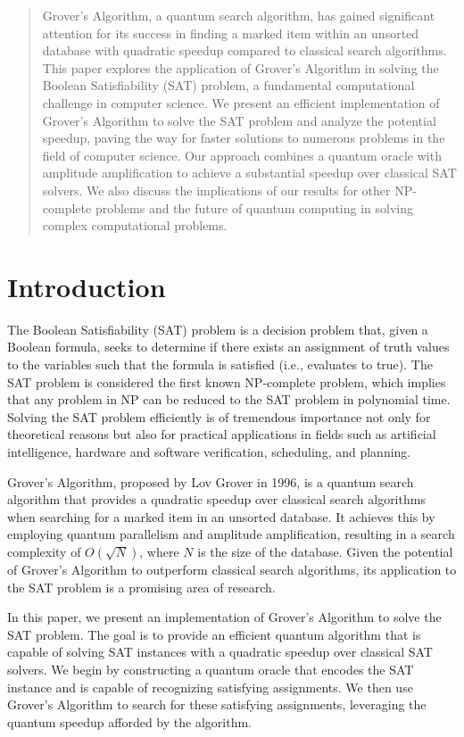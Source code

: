 \begin{abstract}
Grover's Algorithm, a quantum search algorithm, has gained significant attention for its success in finding a marked item within an unsorted database with quadratic speedup compared to classical search algorithms. This paper explores the application of Grover's Algorithm in solving the Boolean Satisfiability (SAT) problem, a fundamental computational challenge in computer science. We present an efficient implementation of Grover's Algorithm to solve the SAT problem and analyze the potential speedup, paving the way for faster solutions to numerous problems in the field of computer science. Our approach combines a quantum oracle with amplitude amplification to achieve a substantial speedup over classical SAT solvers. We also discuss the implications of our results for other NP-complete problems and the future of quantum computing in solving complex computational problems.
\end{abstract}

\section{Introduction}

The Boolean Satisfiability (SAT) problem is a decision problem that, given a Boolean formula, seeks to determine if there exists an assignment of truth values to the variables such that the formula is satisfied (i.e., evaluates to true). The SAT problem is considered the first known NP-complete problem, which implies that any problem in NP can be reduced to the SAT problem in polynomial time. Solving the SAT problem efficiently is of tremendous importance not only for theoretical reasons but also for practical applications in fields such as artificial intelligence, hardware and software verification, scheduling, and planning.

Grover's Algorithm, proposed by Lov Grover in 1996, is a quantum search algorithm that provides a quadratic speedup over classical search algorithms when searching for a marked item in an unsorted database. It achieves this by employing quantum parallelism and amplitude amplification, resulting in a search complexity of $O(\sqrt{N})$, where $N$ is the size of the database. Given the potential of Grover's Algorithm to outperform classical search algorithms, its application to the SAT problem is a promising area of research.

In this paper, we present an implementation of Grover's Algorithm to solve the SAT problem. The goal is to provide an efficient quantum algorithm that is capable of solving SAT instances with a quadratic speedup over classical SAT solvers. We begin by constructing a quantum oracle that encodes the SAT instance and is capable of recognizing satisfying assignments. We then use Grover's Algorithm to search for these satisfying assignments, leveraging the quantum speedup afforded by the algorithm.

